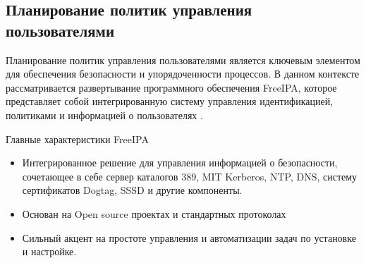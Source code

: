 \documentclass[14pt, a4paper]{extarticle}
\numberwithin{equation}{section}
\begin{document}
\subsection{Планирование политик управления пользователями}
Планирование политик управления пользователями является ключевым элементом для 
обеспечения безопасности и упорядоченности процессов. 
В данном контексте рассматривается развертывание программного обеспечения 
FreeIPA, которое представляет собой интегрированную систему управления идентификацией, 
политиками и информацией о пользователях \cite{freeipa}.

Главные характеристики FreeIPA
\begin{itemize}
        \item Интегрированное решение для управления информацией о безопасности, 
        сочетающее в себе сервер каталогов 389, MIT Kerberos, 
        NTP, DNS, систему сертификатов Dogtag, SSSD и другие компоненты.
        \item Основан на Open source проектах и стандартных протоколах
        \item Сильный акцент на простоте управления и автоматизации задач по установке и настройке.
\end{itemize}
\end{document}
